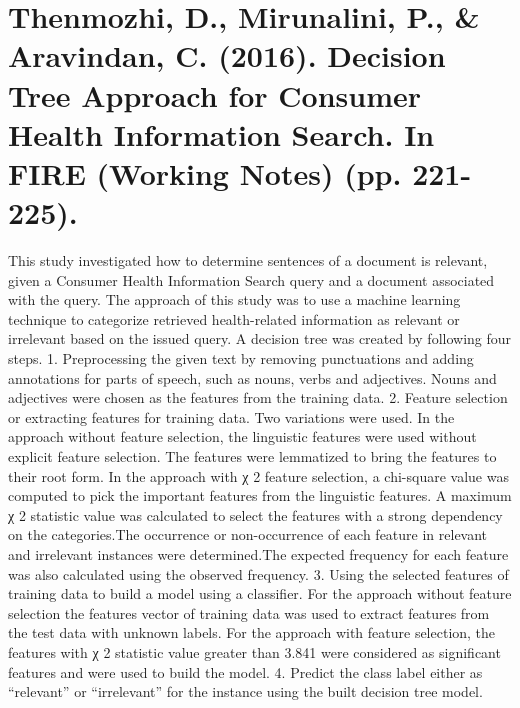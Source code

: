 \documentclass[]{article}
\begin{document}
\section{Thenmozhi, D., Mirunalini, P., \& Aravindan, C. (2016). Decision Tree Approach for Consumer Health Information Search. In FIRE (Working Notes) (pp. 221-225).}

This study investigated how to determine sentences of a document is relevant, given a Consumer Health Information Search query and a document associated with the query. The approach of this study was to use a machine learning technique to categorize retrieved health-related information as relevant or irrelevant based on the issued query. A decision tree was created by following four steps. 1. Preprocessing the given text by removing punctuations and adding annotations for parts of speech, such as nouns, verbs and adjectives. Nouns and adjectives were chosen as the features from the training data. 2. Feature selection or extracting features for training data. Two variations were used. In the approach without feature selection, the linguistic features were used without explicit feature selection. The features were lemmatized to bring the features to their root form. In the approach with χ 2 feature selection, a chi-square value was computed to pick the important features from the linguistic features. A maximum χ 2 statistic value was calculated to select the features with a strong dependency on the categories.The occurrence or non-occurrence of each feature in relevant and irrelevant instances were determined.The expected frequency for each feature was also calculated using the observed frequency. 3. Using the selected features of training data to build a model using a classifier. For the approach without feature selection the features vector of training data was used to extract features from the test data with unknown labels. For the approach with feature selection, the features with  χ 2 statistic value greater than 3.841 were considered as significant features and were used to build the model. 4. Predict the class label either as “relevant” or “irrelevant” for the instance using the built decision tree model. 
\end{document}

